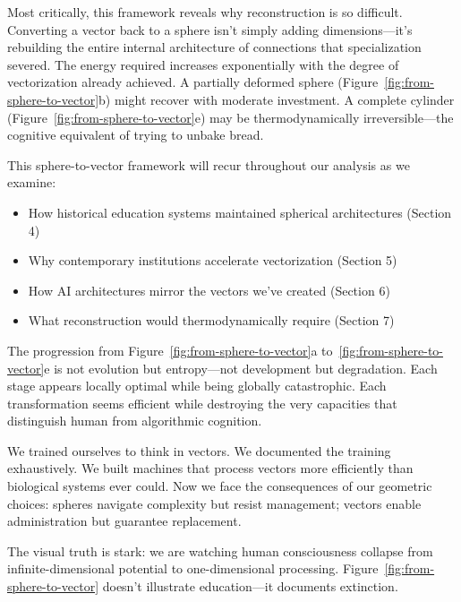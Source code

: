 Most critically, this framework reveals why reconstruction is so difficult. Converting a vector back to a sphere isn't simply adding dimensions---it's rebuilding the entire internal architecture of connections that specialization severed. The energy required increases exponentially with the degree of vectorization already achieved. A partially deformed sphere (Figure~\ref{fig:from-sphere-to-vector}b) might recover with moderate investment. A complete cylinder (Figure~\ref{fig:from-sphere-to-vector}e) may be thermodynamically irreversible---the cognitive equivalent of trying to unbake bread.

This sphere-to-vector framework will recur throughout our analysis as we examine:
\begin{itemize}
\item How historical education systems maintained spherical architectures (Section 4)
\item Why contemporary institutions accelerate vectorization (Section 5)
\item How AI architectures mirror the vectors we've created (Section 6)
\item What reconstruction would thermodynamically require (Section 7)
\end{itemize}

The progression from Figure~\ref{fig:from-sphere-to-vector}a to~\ref{fig:from-sphere-to-vector}e is not evolution but entropy---not development but degradation. Each stage appears locally optimal while being globally catastrophic. Each transformation seems efficient while destroying the very capacities that distinguish human from algorithmic cognition.

We trained ourselves to think in vectors. We documented the training exhaustively. We built machines that process vectors more efficiently than biological systems ever could. Now we face the consequences of our geometric choices: spheres navigate complexity but resist management; vectors enable administration but guarantee replacement.

The visual truth is stark: we are watching human consciousness collapse from infinite-dimensional potential to one-dimensional processing. Figure~\ref{fig:from-sphere-to-vector} doesn't illustrate education---it documents extinction.